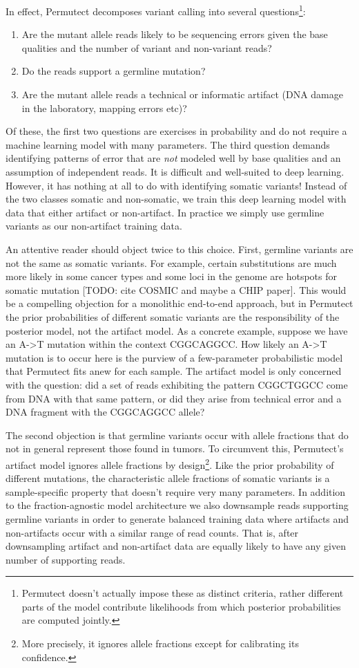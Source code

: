 \documentclass[times, twoside, watermark]{StyleBioRxiv}
\begin{document}
In effect, Permutect decomposes variant calling into several questions\footnote{Permutect doesn't actually impose these as distinct criteria, rather different parts of the model contribute likelihoods from which posterior probabilities are computed jointly.}: 
\begin{enumerate}
    \item Are the mutant allele reads likely to be sequencing errors given the base qualities and the number of variant and non-variant reads?
    \item Do the reads support a germline mutation?
    \item Are the mutant allele reads a technical or informatic artifact (DNA damage in the laboratory, mapping errors etc)?
\end{enumerate}
Of these, the first two questions are exercises in probability and do not require a machine learning model with many parameters.  The third question demands identifying patterns of error that are \textit{not} modeled well by base qualities and an assumption of independent reads.  It is difficult and well-suited to deep learning.  However, it has nothing at all to do with identifying somatic variants!  Instead of the two classes somatic and non-somatic, we train this deep learning model with data that either artifact or non-artifact.  In practice we simply use germline variants as our non-artifact training data.

An attentive reader should object twice to this choice.  First, germline variants are not the same as somatic variants.  For example, certain substitutions are much more likely in some cancer types and some loci in the genome are hotspots for somatic mutation [TODO: cite COSMIC and maybe a CHIP paper].  This would be a compelling objection for a monolithic end-to-end approach, but in Permutect the prior probabilities of different somatic variants are the responsibility of the posterior model, not the artifact model.  As a concrete example, suppose we have an A->T mutation within the context CGGCAGGCC.  How likely an A->T mutation is to occur here is the purview of a few-parameter probabilistic model that Permutect fits anew for each sample.  The artifact model is only concerned with the question: did a set of reads exhibiting the pattern CGGCTGGCC come from DNA with that same pattern, or did they arise from technical error and a DNA fragment with the CGGCAGGCC allele?

The second objection is that germline variants occur with allele fractions that do not in general represent those found in tumors.  To circumvent this, Permutect's artifact model ignores allele fractions by design\footnote{More precisely, it ignores allele fractions except for calibrating its confidence.}.  Like the prior probability of different mutations, the characteristic allele fractions of somatic variants is a sample-specific property that doesn't require very many parameters.  In addition to the fraction-agnostic model architecture we also downsample reads supporting germline variants in order to generate balanced training data where artifacts and non-artifacts occur with a similar range of read counts.  That is, after downsampling artifact and non-artifact data are equally likely to have any given number of supporting reads.
\end{document}
